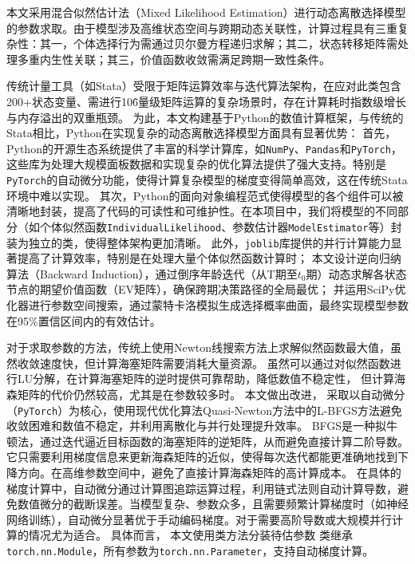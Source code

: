 \documentclass[
  a4paper,
  zihao=-4,
  fontset=mac,
  AutoFakeBold,
  AutoFakeSlant,
  oneside]{ctexbook}
\begin{document}
本文采用混合似然估计法（Mixed Likelihood Estimation）进行动态离散选择模型的参数求取。由于模型涉及高维状态空间与跨期动态关联性，计算过程具有三重复杂性：其一，个体选择行为需通过贝尔曼方程递归求解；其二，状态转移矩阵需处理多重内生性关联；其三，价值函数收敛需满足跨期一致性条件。

传统计量工具（如Stata）受限于矩阵运算效率与迭代算法架构，在应对此类包含200+状态变量、需进行10\^6量级矩阵运算的复杂场景时，存在计算耗时指数级增长与内存溢出的双重瓶颈。
为此，本文构建基于Python的数值计算框架，与传统的Stata相比，Python在实现复杂的动态离散选择模型方面具有显著优势：
首先，Python的开源生态系统提供了丰富的科学计算库，如\lstinline{NumPy}、\lstinline{Pandas}和\lstinline{PyTorch}，这些库为处理大规模面板数据和实现复杂的优化算法提供了强大支持。特别是\lstinline{PyTorch}的自动微分功能，使得计算复杂模型的梯度变得简单高效，这在传统Stata环境中难以实现。
其次，Python的面向对象编程范式使得模型的各个组件可以被清晰地封装，提高了代码的可读性和可维护性。在本项目中，我们将模型的不同部分（如个体似然函数\lstinline{IndividualLikelihood}、参数估计器\lstinline{ModelEstimator}等）封装为独立的类，使得整体架构更加清晰。
此外，\lstinline{joblib}库提供的并行计算能力显著提高了计算效率，特别是在处理大量个体似然函数计算时；
本文设计逆向归纳算法（Backward Induction），通过倒序年龄迭代（从T期至$t_0$期）动态求解各状态节点的期望价值函数（EV矩阵），确保跨期决策路径的全局最优；
并运用SciPy优化器进行参数空间搜索，通过蒙特卡洛模拟生成选择概率曲面，最终实现模型参数在95\%置信区间内的有效估计。


对于求取参数的方法，传统上使用Newton线搜索方法上求解似然函数最大值，虽然收敛速度快，但计算海塞矩阵需要消耗大量资源。
虽然可以通过对似然函数进行LU分解，在计算海塞矩阵的逆时提供可靠帮助，降低数值不稳定性，
但计算海森矩阵的代价仍然较高，尤其是在参数较多时。
本文做出改进，
采取以自动微分（\lstinline{PyTorch}）为核心，使用现代优化算法Quasi-Newton方法中的L-BFGS方法避免收敛困难和数值不稳定，并利用离散化与并行处理提升效率。
BFGS是一种拟牛顿法，通过迭代逼近目标函数的海塞矩阵的逆矩阵，从而避免直接计算二阶导数。它只需要利用梯度信息来更新海森矩阵的近似，使得每次迭代都能更准确地找到下降方向。在高维参数空间中，避免了直接计算海森矩阵的高计算成本。
在具体的梯度计算中，自动微分通过计算图追踪运算过程，利用链式法则自动计算导数，避免数值微分的截断误差。当模型复杂、参数众多，且需要频繁计算梯度时（如神经网络训练），自动微分显著优于手动编码梯度。对于需要高阶导数或大规模并行计算的情况尤为适合。
具体而言，
本文使用类方法分装待估参数
类继承
\lstinline{torch.nn.Module}，所有参数为\lstinline{torch.nn.Parameter}，支持自动梯度计算。
\end{document}
